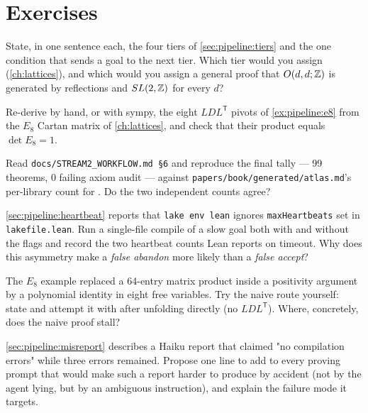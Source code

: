 \section*{Exercises}

\begin{exercise}[$\star$]
State, in one sentence each, the four tiers of \cref{sec:pipeline:tiers} and the one
condition that sends a goal to the next tier. Which tier would you assign
 (\cref{ch:lattices}), and which would you assign a general
proof that $O(d,d;\mathbb{Z})$ is generated by reflections and $SL(2,\mathbb{Z})$ for every $d$?
\end{exercise}

\begin{exercise}[$\star$]
Re-derive by hand, or with sympy, the eight $LDL^{\mathsf T}$ pivots of
\cref{ex:pipeline:e8} from the $E_8$ Cartan matrix of \cref{ch:lattices}, and check that
their product equals $\det E_8=1$.
\end{exercise}

\begin{exercise}[$\star$]
Read \texttt{docs/STREAM2\allowbreak\_WORKFLOW.md §6} and reproduce the final tally --- 99 theorems,
0 failing axiom audit --- against \texttt{papers/book/generated/atlas.md}'s
per-library count for . Do the two independent counts agree?
\end{exercise}

\begin{exercise}[$\star\star$]
\cref{sec:pipeline:heartbeat} reports that \texttt{lake env lean} ignores
\texttt{maxHeartbeats} set in \texttt{lakefile.lean}. Run a single-file compile of a slow
goal both with and without the flags  and record the two heartbeat counts Lean reports on
timeout. Why does this asymmetry make a \emph{false abandon} more likely than a
\emph{false accept}?
\end{exercise}

\begin{exercise}[$\star\star$]
The $E_8$ example replaced a 64-entry matrix product inside a positivity argument by a
polynomial identity in eight free variables. Try the naive route yourself: state
 and attempt it with  after unfolding
 directly (no $LDL^{\mathsf T}$). Where, concretely, does the naive
proof stall?
\end{exercise}

\begin{exercise}[$\star\star$]
\cref{sec:pipeline:misreport} describes a Haiku report that claimed "no compilation
errors" while three errors remained. Propose one line to add to every proving prompt that
would make such a report harder to produce by accident (not by the agent lying, but by an
ambiguous instruction), and explain the failure mode it targets.
\end{exercise}


